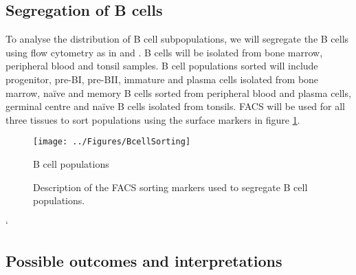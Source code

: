 \documentclass[12pt]{article}
\newcommand{\naive}{na\"{i}ve }
\begin{document}
				\subsection{Segregation of B cells}
				
				To analyse the distribution of B cell subpopulations, we will segregate the B cells using flow cytometry as in \citet{Kulis15} and \citet{Oakes16}.
				B cells will be isolated from bone marrow, peripheral blood and tonsil samples. 
				B cell populations sorted will include progenitor, pre-BI, pre-BII, immature and plasma cells isolated from bone marrow, \naive and memory B cells sorted from peripheral blood and plasma cells, germinal centre and \naive B cells isolated from tonsils. 
				FACS will be used for all three tissues to sort populations using the surface markers in figure \ref{fig:BCellSorting}.
				
				\begin{figure}[tb]
					\centering

						\texttt{[image: ../Figures/BcellSorting]}
						\caption{B cell populations}
						\label{fig:BCellSorting}
					\caption{Description of the FACS sorting markers used to segregate B cell populations.} %
				\end{figure}`

		
		\subsection{Possible outcomes and interpretations}		
		
\end{document}
